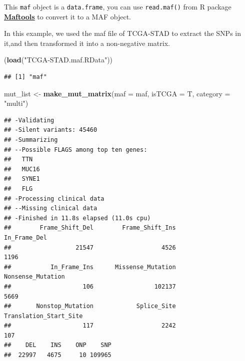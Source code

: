 \documentclass[
  12pt,
]{book}
\newenvironment{Shaded}{\begin{snugshade}}{\end{snugshade}}
\newcommand{\AttributeTok}[1]{\textcolor[rgb]{0.13,0.29,0.53}{#1}}
\newcommand{\FunctionTok}[1]{\textcolor[rgb]{0.13,0.29,0.53}{\textbf{#1}}}
\newcommand{\NormalTok}[1]{#1}
\newcommand{\OtherTok}[1]{\textcolor[rgb]{0.56,0.35,0.01}{#1}}
\newcommand{\SpecialCharTok}[1]{\textcolor[rgb]{0.81,0.36,0.00}{\textbf{#1}}}
\newcommand{\StringTok}[1]{\textcolor[rgb]{0.31,0.60,0.02}{#1}}
\begin{document}
This \texttt{maf} object is a \texttt{data.frame}, you can use \texttt{read.maf()} from R package \textbf{\href{https://github.com/PoisonAlien/maftools}{Maftools}} to convert it to a MAF object.

In this example, we used the maf file of TCGA-STAD to extract the SNPs in it,and then transformed it into a non-negative matrix.

\begin{Shaded}
\begin{Highlighting}[]
\NormalTok{(}\FunctionTok{load}\NormalTok{(}\StringTok{"TCGA{-}STAD.maf.RData"}\NormalTok{))}
\end{Highlighting}
\end{Shaded}

\begin{verbatim}
## [1] "maf"
\end{verbatim}

\begin{Shaded}
\begin{Highlighting}[]
\NormalTok{mut\_list }\OtherTok{\textless{}{-}} \FunctionTok{make\_mut\_matrix}\NormalTok{(}\AttributeTok{maf =}\NormalTok{ maf, }\AttributeTok{isTCGA   =}\NormalTok{ T, }\AttributeTok{category =} \StringTok{"multi"}\NormalTok{)}
\end{Highlighting}
\end{Shaded}

\begin{verbatim}
## -Validating
## -Silent variants: 45460 
## -Summarizing
## --Possible FLAGS among top ten genes:
##   TTN
##   MUC16
##   SYNE1
##   FLG
## -Processing clinical data
## --Missing clinical data
## -Finished in 11.8s elapsed (11.0s cpu) 
##        Frame_Shift_Del        Frame_Shift_Ins           In_Frame_Del 
##                  21547                   4526                   1196 
##           In_Frame_Ins      Missense_Mutation      Nonsense_Mutation 
##                    106                 102137                   5669 
##       Nonstop_Mutation            Splice_Site Translation_Start_Site 
##                    117                   2242                    107 
##    DEL    INS    ONP    SNP 
##  22997   4675     10 109965
\end{verbatim}

\begin{Shaded}
\end{Shaded}
\end{document}
